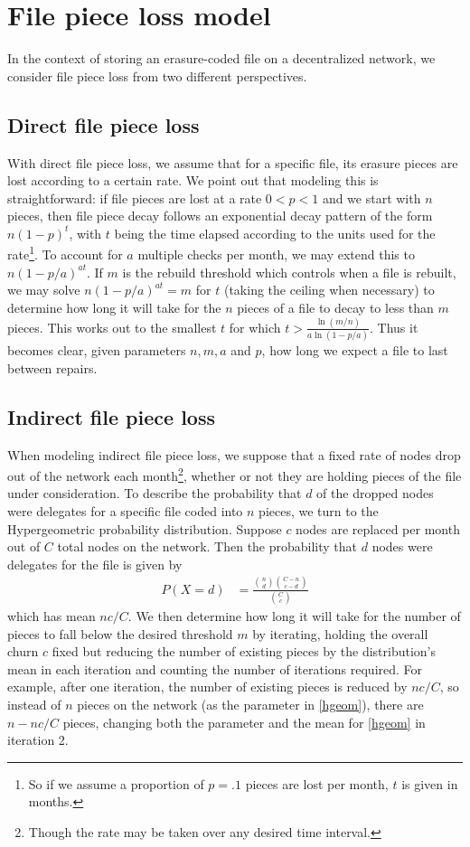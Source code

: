\section{File piece loss model}
\linespread{2.0}

In the context of storing an erasure-coded file on a decentralized network, we consider file piece loss from two different perspectives.

\subsection{Direct file piece loss}
With direct file piece loss, we assume that for a specific file, its erasure pieces are lost according to a certain rate. We point out that modeling this is straightforward: if file pieces are lost at a rate $0<p<1$ and we start with $n$ pieces, then file piece decay follows an exponential decay pattern of the form $n(1-p)^t$, with $t$ being the time elapsed according to the units used for the rate\footnote{So if we assume a proportion of $p=.1$ pieces are lost per month, $t$ is given in months.}. 
To account for $a$ multiple checks per month, we may extend this to $n(1-p/a)^{at}$. If $m$ is the rebuild threshold which controls when a file is rebuilt, we may solve $n(1-p/a)^{at}=m$ for $t$ (taking the ceiling when necessary) to determine how long it will take for the $n$ pieces of a file to decay to less than $m$ pieces. This works out to the smallest $t$ for which
$t>\frac{\ln(m/n)}{a\ln(1-p/a)}$. Thus it becomes clear, given parameters $n,m,a$ and $p$, how long we expect a file to last between repairs.

\subsection{Indirect file piece loss}

When modeling indirect file piece loss, we suppose that a fixed rate of nodes 
drop out of the network each month\footnote{Though the rate may be taken over 
any desired time interval.}, whether or not they are holding pieces of the file 
under consideration. To describe the probability that $d$ of the dropped nodes 
were delegates for a specific file coded into $n$ pieces, we turn to the 
Hypergeometric probability distribution. Suppose $c$ nodes are replaced per 
month out of $C$ total nodes on the network. Then the probability that $d$ 
nodes were delegates for the file is given by
\begin{align}
    P(X=d)&=\frac{\binom{n}{d}\binom{C-n}{c-d}}{\binom{C}{c}}\label{hgeom}
\end{align}
which has mean $nc/C$. We then determine how long it will take for the number of pieces to fall below the desired threshold $m$ by iterating, holding the overall churn $c$ fixed but reducing the number of existing pieces by the distribution's mean in each iteration and counting the number of iterations required. For example, after one iteration, the number of existing pieces is reduced by $nc/C$, so instead of $n$ pieces on the network (as the parameter in \eqref{hgeom}), there are $n-nc/C$ pieces, changing both the parameter and the mean for \eqref{hgeom} in iteration 2.

